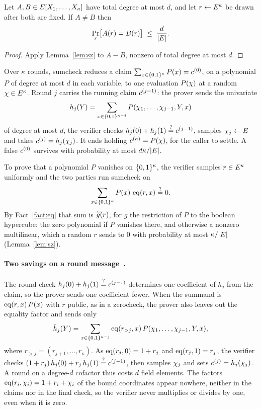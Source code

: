 \begin{corollary}\label{cor:idtest}
Let $A,B\in E[X_1,\dots,X_{\kappa}]$ have total degree at most $d$, and let $r\leftarrow E^{\kappa}$ be drawn after both are fixed. If $A\neq B$ then
\[
  \Pr_{r}\bigl[A(r)=B(r)\bigr]\;\le\;\frac{d}{|E|}.
\]
\end{corollary}

\begin{proof}
Apply Lemma~\ref{lem:sz} to $A-B$, nonzero of total degree at most $d$.
\end{proof}


\begin{fact}\label{fact:sumcheck}
Over $\kappa$ rounds, sumcheck reduces a claim $\sum_{x\in\{0,1\}^{\kappa}}P(x)=c^{(0)}$, on a polynomial $P$ of degree at most $d$ in each variable, to one evaluation $P(\chi)$ at a random $\chi\in E^{\kappa}$. Round $j$ carries the running claim $c^{(j-1)}$: the prover sends the univariate
\[
  h_j(Y)=\sum_{x\in\{0,1\}^{\kappa-j}}P(\chi_1,\dots,\chi_{j-1},Y,x)
\]
of degree at most $d$, the verifier checks $h_j(0)+h_j(1)\stackrel{?}{=}c^{(j-1)}$, samples $\chi_j\leftarrow E$ and takes $c^{(j)}=h_j(\chi_j)$. It ends holding $c^{(\kappa)}=P(\chi)$, for the caller to settle. A false $c^{(0)}$ survives with probability at most $d\kappa/|E|$.
\end{fact}

\begin{definition}[Zerocheck]\label{def:zerocheck}
To prove that a polynomial $P$ vanishes on $\{0,1\}^{\kappa}$, the verifier samples $r\in E^{\kappa}$ uniformly and the two parties run sumcheck on
\[
  \sum_{x\in\{0,1\}^{\kappa}}P(x)\,\operatorname{eq}(r,x)\stackrel{?}{=} 0 .
\]
By Fact~\ref{fact:eq} that sum is $\widetilde{g}(r)$, for $g$ the restriction of $P$ to the boolean hypercube: the zero polynomial if $P$ vanishes there, and otherwise a nonzero multilinear, which a random $r$ sends to $0$ with probability at most $\kappa/|E|$ (Lemma~\ref{lem:sz}).
\end{definition}

\paragraph{Two savings on a round message~\cite{Gru24}.} The round check $h_j(0)+h_j(1)\stackrel{?}{=}c^{(j-1)}$ determines one coefficient of $h_j$ from the claim, so the prover sends one coefficient fewer. When the summand is $\operatorname{eq}(r,x)\,P(x)$ with $r$ public, as in a zerocheck, the prover also leaves out the equality factor and sends only
\[
  \bar h_j(Y)=\sum_{x\in\{0,1\}^{\kappa-j}}\operatorname{eq}(r_{>j},x)\,P(\chi_1,\dots,\chi_{j-1},Y,x),
\]
where $r_{>j}=(r_{j+1},\dots,r_{\kappa})$. As $\operatorname{eq}(r_j,0)=1+r_j$ and $\operatorname{eq}(r_j,1)=r_j$, the verifier checks $(1+r_j)\,\bar h_j(0)+r_j\,\bar h_j(1)\stackrel{?}{=}c^{(j-1)}$, then samples $\chi_j$ and sets $c^{(j)}=\bar h_j(\chi_j)$. A round on a degree-$d$ cofactor thus costs $d$ field elements. The factors $\operatorname{eq}(r_i,\chi_i)=1+r_i+\chi_i$ of the bound coordinates appear nowhere, neither in the claims nor in the final check, so the verifier never multiplies or divides by one, even when it is zero.

